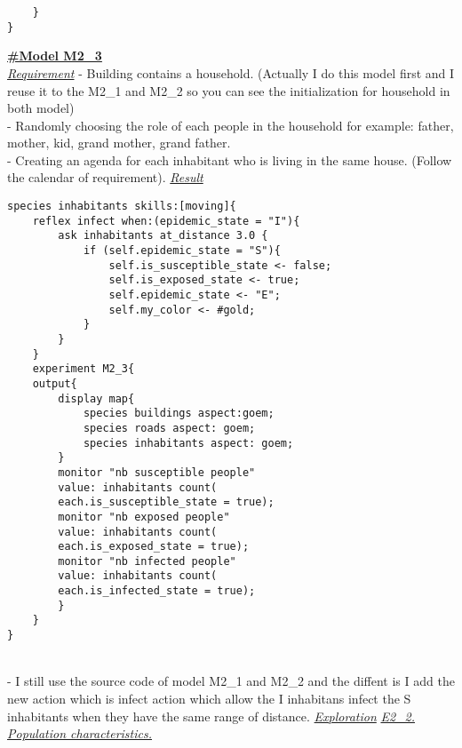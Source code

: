 \documentclass{article}
\begin{document}
\begin{pic15}
\begin{pic15}
\begin{tcolorbox}
\begin{lstlisting}
	}
}
\end{lstlisting}
\end{tcolorbox}
\newpage
\underline{\textbf{#Model M2\_3}}\\
\newline\newline
\underline{\emph{Requirement}}
\newline\newline
- Building contains a household. (Actually I do this model first and I reuse it to the M2\_1 and M2\_2 so you can see the initialization for household in both model)
\\
- Randomly choosing the role of each people in the household for example: father, mother, kid, grand mother, grand father.
\\
- Creating an agenda for each inhabitant who is living in the same house. (Follow the calendar of requirement).
\newline\newline
\underline{\emph{Result}}\newline\newline
\begin{tcolorbox}
\begin{lstlisting}
species inhabitants skills:[moving]{
	reflex infect when:(epidemic_state = "I"){
		ask inhabitants at_distance 3.0 {
			if (self.epidemic_state = "S"){
				self.is_susceptible_state <- false;
				self.is_exposed_state <- true;
				self.epidemic_state <- "E";
				self.my_color <- #gold;
			}
		}
	}
	experiment M2_3{
	output{
		display map{
			species buildings aspect:goem;
			species roads aspect: goem;
			species inhabitants aspect: goem;
		}
		monitor "nb susceptible people" 
		value: inhabitants count(
		each.is_susceptible_state = true);
		monitor "nb exposed people" 
		value: inhabitants count(
		each.is_exposed_state = true);
		monitor "nb infected people" 
		value: inhabitants count(
		each.is_infected_state = true);
		}
	}
}
\end{lstlisting}
\end{tcolorbox}
\newpage
\\- I still use the source code of model M2\_1 and M2\_2 and the diffent is I add the new action which is infect action which allow the I inhabitans infect the S inhabitants when they have the same range of distance.
\newline\newline
\underline{\emph{Exploration}}
\newline\newline
\underline{\textit{E2\_2. Population characteristics.}}

\end{pic15}
\end{pic15}
\end{document}
